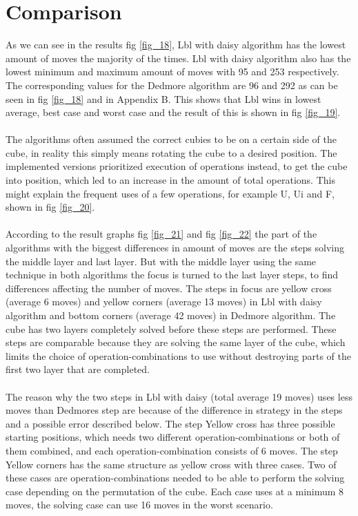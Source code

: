 \documentclass[a4paper,11pt]{kth-mag}
\begin{document}
\section{Comparison}
As we can see in the results fig \ref{fig_18}, Lbl with daisy algorithm has the lowest amount of moves the majority of the times. Lbl with daisy algorithm also has the lowest minimum and maximum amount of moves with 95 and 253 respectively. The corresponding values for the Dedmore algorithm are 96 and 292 as can be seen in fig \ref{fig_18} and in Appendix B. This shows that Lbl wins in lowest average, best case and worst case and the result of this is shown in fig \ref{fig_19}.\\\\
The algorithms often assumed the correct cubies to be on a certain side of the cube, in reality this simply means rotating the cube to a desired position. The implemented versions prioritized execution of operations instead, to get the cube into position, which led to an increase in the amount of total operations. This might explain the frequent uses of a few operations, for example U, Ui and F, shown in fig \ref{fig_20}.\\\\
According to the result graphs fig \ref{fig_21} and fig \ref{fig_22} the part of the algorithms with the biggest differences in amount of moves are the steps solving the middle layer and last layer. But with the middle layer using the same technique in both algorithms the focus is turned to the last layer steps, to find differences affecting the number of moves. The steps in focus are yellow cross (average 6 moves) and yellow corners (average 13 moves) in Lbl with daisy algorithm and bottom corners (average 42 moves) in Dedmore algorithm. The cube has two layers completely solved before these steps are performed. These steps are comparable because they are solving the same layer of the cube, which limits the choice of operation-combinations to use without destroying parts of the first two layer that are completed.\\\\ 
The reason why the two steps in Lbl with daisy (total average 19 moves) uses less moves than Dedmores step are because of the difference in strategy in the steps and a possible error described below.
The step Yellow cross has three possible starting positions, which needs two different operation-combinations or both of them combined, and each operation-combination consists of 6 moves.
The step Yellow corners has the same structure as yellow cross with three cases. Two of these cases are operation-combinations needed to be able to perform the solving case depending on the permutation of the cube. Each case uses at a minimum 8 moves, the solving case can use 16 moves in the worst scenario.\\\\
\end{document}
